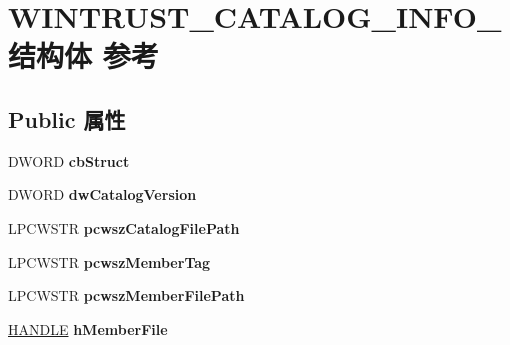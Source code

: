 \hypertarget{struct_w_i_n_t_r_u_s_t___c_a_t_a_l_o_g___i_n_f_o__}{}\section{W\+I\+N\+T\+R\+U\+S\+T\+\_\+\+C\+A\+T\+A\+L\+O\+G\+\_\+\+I\+N\+F\+O\+\_\+结构体 参考}
\label{struct_w_i_n_t_r_u_s_t___c_a_t_a_l_o_g___i_n_f_o__}
\subsection*{Public 属性}
\begin{DoxyCompactItemize}
\item 
\mbox{\label{struct_w_i_n_t_r_u_s_t___c_a_t_a_l_o_g___i_n_f_o___a1501055deebb59105bb0442d8dc8b2a3}} 
D\+W\+O\+RD {\bfseries cb\+Struct}
\item 
\mbox{\label{struct_w_i_n_t_r_u_s_t___c_a_t_a_l_o_g___i_n_f_o___a85a8a8ad879b461ee3050e8f31bfb792}} 
D\+W\+O\+RD {\bfseries dw\+Catalog\+Version}
\item 
\mbox{\label{struct_w_i_n_t_r_u_s_t___c_a_t_a_l_o_g___i_n_f_o___a23b48962ff5f60946f7aefb66bf2ad69}} 
L\+P\+C\+W\+S\+TR {\bfseries pcwsz\+Catalog\+File\+Path}
\item 
\mbox{\label{struct_w_i_n_t_r_u_s_t___c_a_t_a_l_o_g___i_n_f_o___a540771e6d8f14c632144b76b21101d0c}} 
L\+P\+C\+W\+S\+TR {\bfseries pcwsz\+Member\+Tag}
\item 
\mbox{\label{struct_w_i_n_t_r_u_s_t___c_a_t_a_l_o_g___i_n_f_o___a553b971a1f9c4b45325a891e2411251b}} 
L\+P\+C\+W\+S\+TR {\bfseries pcwsz\+Member\+File\+Path}
\item 
\mbox{\label{struct_w_i_n_t_r_u_s_t___c_a_t_a_l_o_g___i_n_f_o___a507df8c1b56287f174b53b77df7baecc}} 
\hyperlink{interfacevoid}{H\+A\+N\+D\+LE} {\bfseries h\+Member\+File}
\item 

\end{DoxyCompactItemize}
